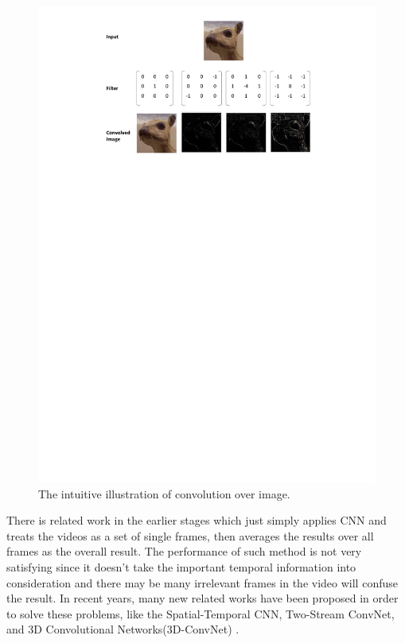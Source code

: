 \begin{figure}
	\includegraphics[trim=2cm 20cm 0cm 1cm]{figs/conv.pdf}
	\caption{The intuitive illustration of convolution over image.}
	\label{fig:conv}
\end{figure}
 
\par
There is related work \cite{ning2005} in the earlier stages which just simply applies CNN and treats the videos as a set of single frames, then averages the results over all frames as the overall result. The performance of such method is not very satisfying since it doesn't take the important temporal information into consideration and there may be many irrelevant frames in the video will confuse the result. In recent years, many new related works have been proposed in order to solve these problems, like the Spatial-Temporal CNN\cite{karpathy2014}, Two-Stream ConvNet\cite{simonyan2014}, and 3D Convolutional Networks(3D-ConvNet) \cite{3dcnn_1} \cite{Ji2013} \cite{Tran2015}.  

